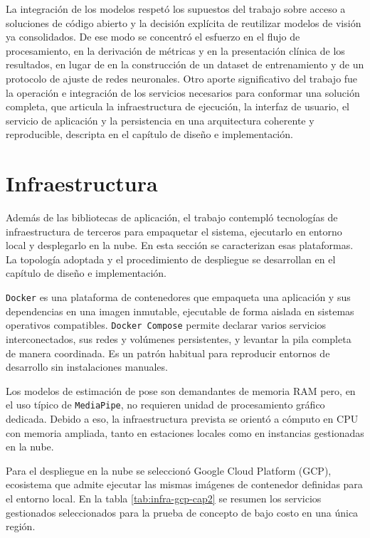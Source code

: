 La integración de los modelos respetó los supuestos del trabajo sobre acceso a soluciones de código abierto y la decisión explícita de reutilizar modelos de visión ya consolidados. De ese modo se concentró el esfuerzo en el flujo de procesamiento, en la derivación de métricas y en la presentación clínica de los resultados, en lugar de en la construcción de un dataset de entrenamiento y de un protocolo de ajuste de redes neuronales. Otro aporte significativo del trabajo fue la operación e integración de los servicios necesarios para conformar una solución completa, que articula la infraestructura de ejecución, la interfaz de usuario, el servicio de aplicación y la persistencia en una arquitectura coherente y reproducible, descripta en el capítulo de diseño e implementación.

\section{Infraestructura}
\label{sec:infraestructura}

Además de las bibliotecas de aplicación, el trabajo contempló tecnologías de infraestructura de terceros para empaquetar el sistema, ejecutarlo en entorno local y desplegarlo en la nube. En esta sección se caracterizan esas plataformas. La topología adoptada y el procedimiento de despliegue se desarrollan en el capítulo de diseño e implementación.

\texttt{Docker} \citep{merkel2014docker} es una plataforma de contenedores que empaqueta una aplicación y sus dependencias en una imagen inmutable, ejecutable de forma aislada en sistemas operativos compatibles. \texttt{Docker Compose} permite declarar varios servicios interconectados, sus redes y volúmenes persistentes, y levantar la pila completa de manera coordinada. Es un patrón habitual para reproducir entornos de desarrollo sin instalaciones manuales.

Los modelos de estimación de pose son demandantes de memoria RAM pero, en el uso típico de \texttt{MediaPipe}, no requieren unidad de procesamiento gráfico dedicada. Debido a eso, la infraestructura prevista se orientó a cómputo en CPU con memoria ampliada, tanto en estaciones locales como en instancias gestionadas en la nube.

Para el despliegue en la nube se seleccionó Google Cloud Platform (GCP), ecosistema que admite ejecutar las mismas imágenes de contenedor definidas para el entorno local. En la tabla \ref{tab:infra-gcp-cap2} se resumen los servicios gestionados seleccionados para la prueba de concepto de bajo costo en una única región.

